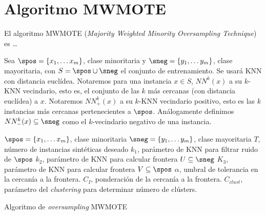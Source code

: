 \section{Algoritmo MWMOTE}
El algoritmo MWMOTE (\textit{Majority Weighted Minority Oversampling Technique}) es \ldots

Sea $\spos = \{x_1, \ldots x_m\}$, clase minoritaria y $\sneg = \{y_1, \ldots y_m\}$, clase mayoritaria, con $S= \spos \cup \sneg$
el conjunto de entrenamiento. Se usará KNN con distancia euclídea. Notaremos para una instancia $x\in S$, $NN^{k}(x)$ a su 
$k$-KNN vecindario, esto es, el conjunto de las $k$ más cercanas (con distancia euclídea) a $x$. Notaremos $NN_{+}^k(x)$
a su $k$-KNN vecindario positivo, esto es las $k$ instancias más cercanas pertenecientes a $\spos$. Análogamente definimos 
$NN_{-}^k(x) \subseteq \sneg$ como el $k$-vecindario negativo de una instancia.

\begin{algorithm}[H]
\begin{algorithmic}[1]
  \REQUIRE $\spos = \{x_1, \ldots x_m\}$, clase minoritaria
  \REQUIRE $\sneg = \{y_1, \ldots y_m\}$, clase mayoritaria
  \REQUIRE $T$, número de instancias sintéticas deseado
  \REQUIRE $k_{1}$, parámetro de KNN para filtrar ruido de $\spos$
  \REQUIRE $k_{2}$, parámetro de KNN para calcular frontera $U \subseteq \sneg$
  \REQUIRE $K_{3}$, parámetro de KNN para calcular frontera $V \subseteq \spos$
  \REQUIRE $\alpha$, umbral de tolerancia en la cercanía a la frontera.
  \REQUIRE $C_{I}$, ponderación de la cercanía a la frontera.
  \REQUIRE $C_{clust}$, parámetro del \textit{clustering} para determinar número de clústers.
  \NEWLINE
  \ENDFOR
  \NEWLINE
\end{algorithmic}
\caption{Algoritmo de \textit{oversampling} MWMOTE}
\label{alg:mwmote}
\end{algorithm}